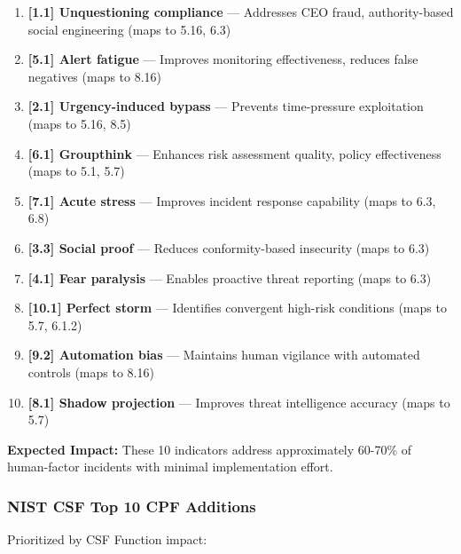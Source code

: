 \documentclass[11pt,a4paper]{article}
\begin{document}
\begin{enumerate}
\item \textbf{[1.1] Unquestioning compliance} --- Addresses CEO fraud, authority-based social engineering (maps to 5.16, 6.3)

\item \textbf{[5.1] Alert fatigue} --- Improves monitoring effectiveness, reduces false negatives (maps to 8.16)

\item \textbf{[2.1] Urgency-induced bypass} --- Prevents time-pressure exploitation (maps to 5.16, 8.5)

\item \textbf{[6.1] Groupthink} --- Enhances risk assessment quality, policy effectiveness (maps to 5.1, 5.7)

\item \textbf{[7.1] Acute stress} --- Improves incident response capability (maps to 6.3, 6.8)

\item \textbf{[3.3] Social proof} --- Reduces conformity-based insecurity (maps to 6.3)

\item \textbf{[4.1] Fear paralysis} --- Enables proactive threat reporting (maps to 6.3)

\item \textbf{[10.1] Perfect storm} --- Identifies convergent high-risk conditions (maps to 5.7, 6.1.2)

\item \textbf{[9.2] Automation bias} --- Maintains human vigilance with automated controls (maps to 8.16)

\item \textbf{[8.1] Shadow projection} --- Improves threat intelligence accuracy (maps to 5.7)
\end{enumerate}

\textbf{Expected Impact:} These 10 indicators address approximately 60-70\% of human-factor incidents with minimal implementation effort.

\subsubsection{NIST CSF Top 10 CPF Additions}

Prioritized by CSF Function impact:
\end{document}

